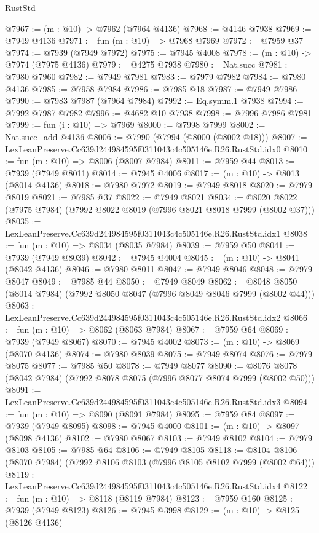 \begin{lexlean}{RustStd}
\begin{coremodule}
@7967 := (m : @10) -> @7962 (@7964 @4136)
@7968 := @4146 @7938
@7969 := @7949 @4136
@7971 := fun (m : @10) => @7968 @7969
@7972 := @7959 @37
@7974 := @7939 (@7949 @7972)
@7975 := @7945 @4008
@7978 := (m : @10) -> @7974 (@7975 @4136)
@7979 := @4275 @7938
@7980 := Nat.succ
@7981 := @7980 @7960
@7982 := @7949 @7981
@7983 := @7979 @7982
@7984 := @7980 @4136
@7985 := @7958 @7984
@7986 := @7985 @18
@7987 := @7949 @7986
@7990 := @7983 @7987 (@7964 @7984)
@7992 := Eq.symm.{1} @7938
@7994 := @7992 @7987 @7982
@7996 := @4682 @10 @7938
@7998 := @7996 @7986 @7981
@7999 := fun (i : @10) => @7969
@8000 := @7998 @7999
@8002 := Nat.succ_add @4136
@8006 := @7990 (@7994 (@8000 (@8002 @18)))
@8007 := LexLeanPreserve.Cc639d244984595f0311043c4c505146e.R26.RustStd.idx0
@8010 := fun (m : @10) => @8006 (@8007 @7984)
@8011 := @7959 @44
@8013 := @7939 (@7949 @8011)
@8014 := @7945 @4006
@8017 := (m : @10) -> @8013 (@8014 @4136)
@8018 := @7980 @7972
@8019 := @7949 @8018
@8020 := @7979 @8019
@8021 := @7985 @37
@8022 := @7949 @8021
@8034 := @8020 @8022 (@7975 @7984) (@7992 @8022 @8019 (@7996 @8021 @8018 @7999 (@8002 @37)))
@8035 := LexLeanPreserve.Cc639d244984595f0311043c4c505146e.R26.RustStd.idx1
@8038 := fun (m : @10) => @8034 (@8035 @7984)
@8039 := @7959 @50
@8041 := @7939 (@7949 @8039)
@8042 := @7945 @4004
@8045 := (m : @10) -> @8041 (@8042 @4136)
@8046 := @7980 @8011
@8047 := @7949 @8046
@8048 := @7979 @8047
@8049 := @7985 @44
@8050 := @7949 @8049
@8062 := @8048 @8050 (@8014 @7984) (@7992 @8050 @8047 (@7996 @8049 @8046 @7999 (@8002 @44)))
@8063 := LexLeanPreserve.Cc639d244984595f0311043c4c505146e.R26.RustStd.idx2
@8066 := fun (m : @10) => @8062 (@8063 @7984)
@8067 := @7959 @64
@8069 := @7939 (@7949 @8067)
@8070 := @7945 @4002
@8073 := (m : @10) -> @8069 (@8070 @4136)
@8074 := @7980 @8039
@8075 := @7949 @8074
@8076 := @7979 @8075
@8077 := @7985 @50
@8078 := @7949 @8077
@8090 := @8076 @8078 (@8042 @7984) (@7992 @8078 @8075 (@7996 @8077 @8074 @7999 (@8002 @50)))
@8091 := LexLeanPreserve.Cc639d244984595f0311043c4c505146e.R26.RustStd.idx3
@8094 := fun (m : @10) => @8090 (@8091 @7984)
@8095 := @7959 @84
@8097 := @7939 (@7949 @8095)
@8098 := @7945 @4000
@8101 := (m : @10) -> @8097 (@8098 @4136)
@8102 := @7980 @8067
@8103 := @7949 @8102
@8104 := @7979 @8103
@8105 := @7985 @64
@8106 := @7949 @8105
@8118 := @8104 @8106 (@8070 @7984) (@7992 @8106 @8103 (@7996 @8105 @8102 @7999 (@8002 @64)))
@8119 := LexLeanPreserve.Cc639d244984595f0311043c4c505146e.R26.RustStd.idx4
@8122 := fun (m : @10) => @8118 (@8119 @7984)
@8123 := @7959 @160
@8125 := @7939 (@7949 @8123)
@8126 := @7945 @3998
@8129 := (m : @10) -> @8125 (@8126 @4136)

\end{coremodule}
\end{lexlean}
